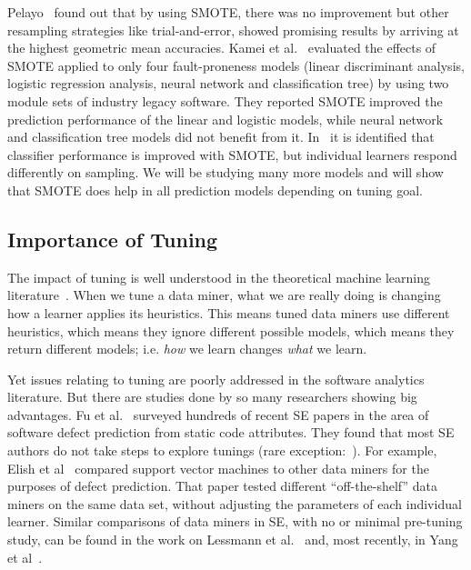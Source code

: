 \documentclass[sigconf,review, anonymous]{acmart}
\theoremstyle{break}
\begin{document}
Pelayo~\cite{pelayo2007applying} found out that by using SMOTE, there was no improvement but other resampling strategies like trial-and-error, showed promising results by arriving at the highest geometric mean accuracies. Kamei et al.~\cite{kamei2007effects} evaluated the effects of SMOTE applied to only four fault-proneness models
(linear discriminant analysis, logistic regression
analysis, neural network and classification tree) by
using two module sets of industry legacy software. They reported SMOTE improved the prediction performance of the linear and logistic models, while neural network and classification tree models did not
benefit from it. In~\cite{van2007experimental} it is identified that classifier performance is improved with SMOTE, but individual learners respond differently on sampling. We will be studying many more models and will show that SMOTE does help in all prediction models depending on tuning goal.

\subsection{Importance of Tuning}
\label{sect:tune}

The impact of tuning is well understood in the theoretical machine learning literature~\cite{bergstra2012random}.  When we tune a
data miner, what we are really doing is changing how a learner applies its
heuristics. This means tuned data miners use different heuristics, which means
they ignore different possible models, which means they return different models;
i.e. \textit{how} we learn changes \textit{what} we learn.

Yet issues relating to
tuning are poorly addressed in the software analytics literature. But there are studies done by so many researchers showing big advantages. Fu et al.~\cite{fu2016tuning} surveyed hundreds of recent SE papers in the area
of software defect prediction from static code attributes. They found that most SE
  authors do not take steps to explore tunings (rare exception:~\cite{tantithamthavorn2016icse}). For example, Elish et
  al~\cite{elish2008predicting} compared support vector machines to other data
  miners for the purposes of defect prediction. That paper tested different
  ``off-the-shelf'' data miners on the same data set, without adjusting the
  parameters of each individual learner. Similar comparisons of data miners in SE,
with no or minimal pre-tuning study, can be found in the work on Lessmann et al.~\cite{4527256}
and, most recently, in Yang et al~\cite{Yang:2016}.  
\end{document}
